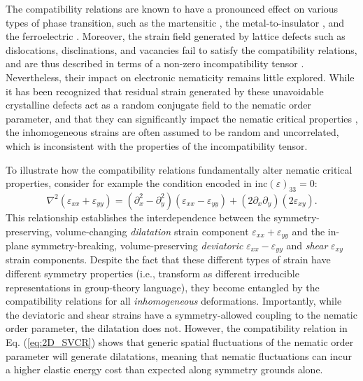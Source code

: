 \documentclass[aps,prb, twocolumn, superscriptaddress, amsmath, amsfonts, amssymb, amsthm]{revtex4-2}
\renewcommand{\eqref}[1]{Eq. (\ref{#1})}
\begin{document}
The compatibility relations are known to have a pronounced effect on various types of phase transition, such as the martensitic
\cite{Kartha1995,Shenoy1999,Rasmussen2001,Lookman2003}, the metal-to-insulator
\cite{Guzman2019}, and the ferroelectric \cite{Littlewood2014,Kimber2023}. Moreover, the strain field generated by lattice defects such as dislocations, disclinations, and vacancies fail to satisfy the compatibility relations, and are thus described in terms of a non-zero incompatibility tensor \citep{eshelbyContinuumTheoryLattice1956, dewitLinearTheoryStatic1970, Dewit1973, dewitTheoryDisclinationsIII1973, dewitTheoryDisclinationsIV1973, kronerekkehartContinuumTheoryDefects1981, kleinertGaugeFieldsSolids1989, valsakumarGaugeTheoryDefects1988, beekmanDualGaugeField2017, Pretko2018_PRL, Pretko2019, gaaFractonelasticityDualityTwisted2021}. Nevertheless, their impact on electronic nematicity remains little explored. While it has been recognized that residual strain generated by these unavoidable crystalline defects act as a random conjugate field to the nematic order parameter, and that they can significantly impact the nematic critical properties \cite{Carlson2006,Phillabaum2012,RMF01_RFBM}, the inhomogeneous strains are often assumed to be random and uncorrelated, which is inconsistent with the properties of the incompatibility tensor.

To illustrate how the compatibility relations fundamentally alter nematic critical properties, consider for example the condition encoded in  $\text{inc}(\varepsilon)_{33} = 0$:
\begin{equation}
\nabla^{2}\left(\varepsilon_{xx}+\varepsilon_{yy}\right)=\left(\partial_{x}^{2}-\partial_{y}^{2}\right)\left(\varepsilon_{xx}-\varepsilon_{yy}\right)+\left(2\partial_{x}\partial_{y}\right)\left(2\varepsilon_{xy}\right).\label{eq:2D_SVCR}
\end{equation}
This relationship establishes the interdependence between the symmetry-preserving, volume-changing \textit{dilatation} strain component $\varepsilon_{xx}+\varepsilon_{yy}$ and the in-plane symmetry-breaking, volume-preserving \textit{deviatoric}  $\varepsilon_{xx} - \varepsilon_{yy}$ and \textit{shear} $\varepsilon_{xy}$ strain components. Despite the fact that these different types of strain have different symmetry properties (i.e., transform as different irreducible representations in group-theory language), they become entangled by the compatibility relations for all \textit{inhomogeneous} deformations. Importantly, while the deviatoric and shear strains have a symmetry-allowed coupling to the nematic order parameter, the dilatation does not.  However, the compatibility relation in \eqref{eq:2D_SVCR} shows that generic spatial fluctuations of the nematic order parameter will generate dilatations, meaning that nematic fluctuations can incur a higher elastic energy cost than expected along symmetry grounds alone.
\end{document}
